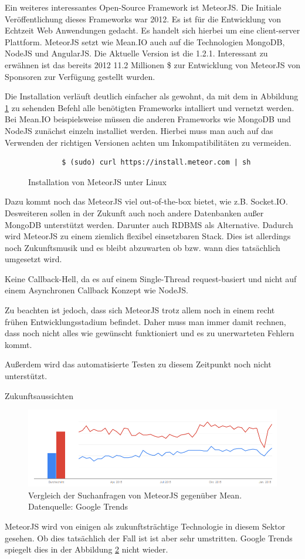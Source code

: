 Ein weiteres interessantes Open-Source Framework ist MeteorJS. Die
Initiale Veröffentlichung dieses Frameworks war 2012. Es ist für die
Entwicklung von Echtzeit Web Anwendungen gedacht. Es handelt sich
hierbei um eine client-server Plattform. MeteorJS setzt wie Mean.IO auch auf die
Technologien MongoDB, NodeJS und AngularJS. Die Aktuelle Version ist
die 1.2.1. Interessant zu erwähnen ist das bereits 2012 11.2 Millionen
\$ zur Entwicklung von MeteorJS von Sponsoren zur Verfügung gestellt wurden.
	
Die Installation verläuft deutlich einfacher als gewohnt, da mit dem in Abbildung \ref{f:instMeteor} zu sehenden Befehl alle benötigten Frameworks intalliert und vernetzt werden. Bei Mean.IO beispielsweise müssen die anderen Frameworks wie MongoDB und NodeJS zunächst einzeln installiet werden. Hierbei muss man auch auf das Verwenden der richtigen Versionen achten um Inkompatibilitäten zu vermeiden.

\begin{figure}[h]
	\centering
	\begin{lstlisting}
		$ (sudo) curl https://install.meteor.com | sh
	\end{lstlisting}
	\caption[instMeteor]{Installation von MeteorJS unter Linux \cite{meteor:t3n}}
	\label{f:instMeteor}
\end{figure}
	
Dazu kommt noch das MeteorJS viel out-of-the-box bietet, wie z.B. Socket.IO. Desweiteren sollen in der Zukunft auch noch andere Datenbanken außer MongoDB unterstützt werden. Darunter auch RDBMS als Alternative. Dadurch wird MeteorJS zu einem ziemlich flexibel einsetzbaren Stack. Dies ist allerdings noch Zukunftsmusik und es bleibt abzuwarten ob bzw. wann dies tatsächlich umgesetzt wird.
	
Keine Callback-Hell, da es auf einem Single-Thread request-basiert und nicht auf einem Asynchronen Callback Konzept wie NodeJS.
	
Zu beachten ist jedoch, dass sich MeteorJS trotz allem noch in einem recht frühen Entwicklungsstadium befindet. Daher muss man immer damit rechnen, dass noch nicht alles wie gewünscht funktioniert und es zu unerwarteten Fehlern kommt.
	
Außerdem wird das automatisierte Testen zu diesem Zeitpunkt noch nicht unterstützt.

Zukunftsaussichten

\begin{figure}[h]
	\centering
	\includegraphics[width=0.7\linewidth]{figures/meteor-vs-mean.png}
	\caption{Vergleich der Suchanfragen von MeteorJS gegenüber Mean. Datenquelle: Google Trends \cite{googleTrends:meteorVsMean}}
	\label{f:mean-frameworks:meteorVsMean}
\end{figure}

MeteorJS wird von einigen als zukunftsträchtige Technologie in diesem Sektor gesehen.
Ob dies tatsächlich der Fall ist ist aber sehr umstritten.
Google Trends spiegelt dies in der Abbildung \ref{f:mean-frameworks:meteorVsMean} nicht wieder.
